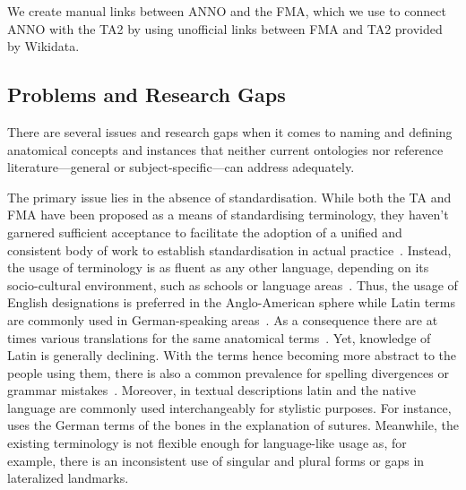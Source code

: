 \documentclass[sw]{iosart2x}
\begin{document}
We create manual links between ANNO and the FMA, which we use to connect ANNO with the TA2 by using unofficial links between FMA and TA2 provided by Wikidata.

\subsection{Problems and Research Gaps}

There are several issues and research gaps when it comes to naming and defining anatomical concepts and instances that neither current ontologies nor reference literature---general or subject-specific---can address adequately.

The primary issue lies in the absence of standardisation.
While both the TA and FMA have been proposed as a means of standardising terminology, they haven't garnered sufficient acceptance to facilitate the adoption of a unified and consistent body of work to establish standardisation in actual practice~\citep{frequencyta,doestamatter,athighlights}.
Instead, the usage of terminology is as fluent as any other language, depending on its socio-cultural environment, such as schools or language areas~\citep{doestamatter,atthennow,atinfo,frequencyta,atcompare}.
Thus, the usage of English designations is preferred in the Anglo-American sphere while Latin terms are commonly used in German-speaking areas~\citep{anatomycontribution,anatomylexicon,reforminganatomical}.
As a consequence there are at times various translations for the same anatomical terms~\citep{naminggame}.
Yet, knowledge of Latin is generally declining.
With the terms hence becoming more abstract to the people using them, there is also a common prevalence for spelling divergences or grammar mistakes~\citep{ta17,anatomylexicon,athighlights,diphthongs}.
Moreover, in textual descriptions latin and the native language are commonly used interchangeably for stylistic purposes.
For instance, \cite{anatomylexicon} uses the German terms of the bones in the explanation of sutures.
Meanwhile, the existing terminology is not flexible enough for language-like usage as, for example, there is an inconsistent use of singular and plural forms or gaps in lateralized landmarks.
\end{document}
